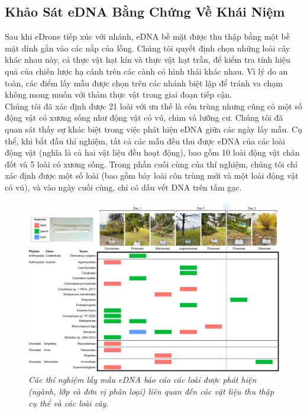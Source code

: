 \documentclass[12pt,a4paper]{article}
\begin{document}
\subsection{Khảo Sát eDNA Bằng Chứng Về Khái Niệm}
Sau khi eDrone tiếp xúc với nhánh, eDNA bề mặt được thu thập bằng một bề mặt dính gắn vào các nắp của lồng. Chúng tôi quyết định chọn những loài cây khác nhau này, cả thực vật hạt kín và thực vật hạt trần, để kiểm tra tính hiệu quả của chiến lược hạ cánh trên các cành có hình thái khác nhau. Vì lý do an toàn, các điểm lấy mẫu được chọn trên các nhánh biệt lập để tránh va chạm không mong muốn với thảm thực vật trong giai đoạn tiếp cận.\\
\linebreak
Chúng tôi đã xác định được 21 loài với ưu thế là côn trùng nhưng cũng có một số động vật có xương sống như động vật có vú, chim và lưỡng cư. Chúng tôi đã quan sát thấy sự khác biệt trong việc phát hiện eDNA giữa các ngày lấy mẫu. Cụ thể, khi bắt đầu thí nghiệm, tất cả các mẫu đều thu được eDNA của các loài động vật (nghĩa là cả hai vật liệu đều hoạt động), bao gồm 10 loài động vật chân đốt và 5 loài có xương sống. Trong phần cuối cùng của thí nghiệm, chúng tôi chỉ xác định được một số loài (bao gồm bảy loài côn trùng mới và một loài động vật có vú), và vào ngày cuối cùng, chỉ có dấu vết DNA trên tấm gạc.\\
\begin{figure}[ht!]
    \centering
    \includegraphics[scale = 0.7]{hinh 7}
    \caption{\textit{Các thí nghiệm lấy mẫu eDNA báo cáo các loài được phát hiện (ngành, lớp và đơn vị phân loại) liên quan đến các vật liệu thu thập cụ thể và các loài cây.}}
    \label{fig7}
\end{figure}
\newpage
\end{document}
